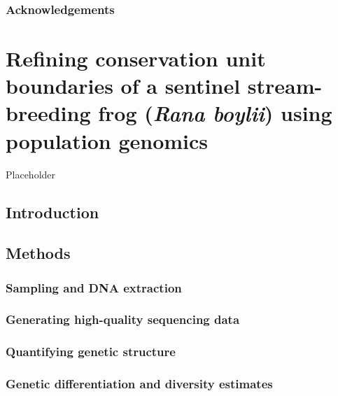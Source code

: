 \documentclass[twoside,12pt,final]{ucthesis-CA2012} %
\begin{document}
\begin{ucmainmatter}
\hypertarget{acknowledgements}{%
\subsection{Acknowledgements}\label{acknowledgements}}

\hypertarget{rangewide}{%
\chapter{\texorpdfstring{Refining conservation unit boundaries of a
sentinel stream-breeding frog (\emph{Rana boylii}) using population
genomics}{Refining conservation unit boundaries of a sentinel stream-breeding frog (Rana boylii) using population genomics}}\label{rangewide}}

Placeholder

\hypertarget{introduction-2}{%
\section{Introduction}\label{introduction-2}}

\hypertarget{methods-2}{%
\section{Methods}\label{methods-2}}

\hypertarget{sampling-and-dna-extraction}{%
\subsection{Sampling and DNA
extraction}\label{sampling-and-dna-extraction}}

\hypertarget{ch3rapture}{%
\subsection{Generating high-quality sequencing data}\label{ch3rapture}}

\hypertarget{quantifying-genetic-structure}{%
\subsection{Quantifying genetic
structure}\label{quantifying-genetic-structure}}

\hypertarget{genetic-differentiation-and-diversity-estimates-1}{%
\subsection{Genetic differentiation and diversity
estimates}\label{genetic-differentiation-and-diversity-estimates-1}}


\end{ucmainmatter}
\end{document}
